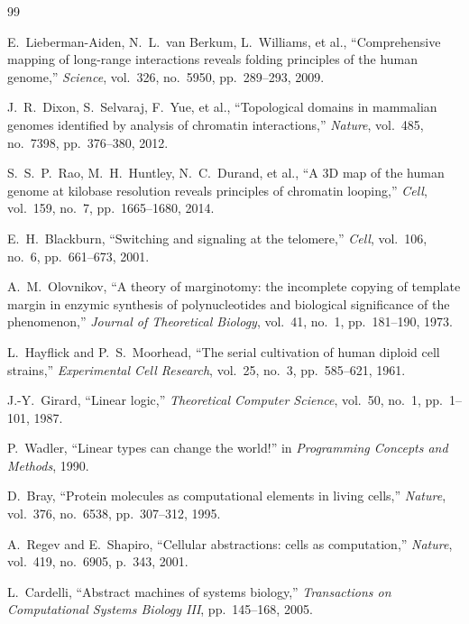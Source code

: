 \documentclass[12pt,a4paper]{article}
\theoremstyle{plain}
\theoremstyle{definition}
\begin{document}
\begin{thebibliography}{99}

E.~Lieberman-Aiden, N.~L.~van Berkum, L.~Williams, et al.,
``Comprehensive mapping of long-range interactions reveals folding principles of the human genome,''
\textit{Science}, vol.~326, no.~5950, pp.~289--293, 2009.

J.~R.~Dixon, S.~Selvaraj, F.~Yue, et al.,
``Topological domains in mammalian genomes identified by analysis of chromatin interactions,''
\textit{Nature}, vol.~485, no.~7398, pp.~376--380, 2012.

S.~S.~P.~Rao, M.~H.~Huntley, N.~C.~Durand, et al.,
``A 3D map of the human genome at kilobase resolution reveals principles of chromatin looping,''
\textit{Cell}, vol.~159, no.~7, pp.~1665--1680, 2014.

E.~H.~Blackburn,
``Switching and signaling at the telomere,''
\textit{Cell}, vol.~106, no.~6, pp.~661--673, 2001.

A.~M.~Olovnikov,
``A theory of marginotomy: the incomplete copying of template margin in enzymic synthesis of polynucleotides and biological significance of the phenomenon,''
\textit{Journal of Theoretical Biology}, vol.~41, no.~1, pp.~181--190, 1973.

L.~Hayflick and P.~S.~Moorhead,
``The serial cultivation of human diploid cell strains,''
\textit{Experimental Cell Research}, vol.~25, no.~3, pp.~585--621, 1961.

J.-Y.~Girard,
``Linear logic,''
\textit{Theoretical Computer Science}, vol.~50, no.~1, pp.~1--101, 1987.

P.~Wadler,
``Linear types can change the world!''
in \textit{Programming Concepts and Methods}, 1990.

D.~Bray,
``Protein molecules as computational elements in living cells,''
\textit{Nature}, vol.~376, no.~6538, pp.~307--312, 1995.

A.~Regev and E.~Shapiro,
``Cellular abstractions: cells as computation,''
\textit{Nature}, vol.~419, no.~6905, p.~343, 2001.

L.~Cardelli,
``Abstract machines of systems biology,''
\textit{Transactions on Computational Systems Biology III}, pp.~145--168, 2005.


\end{thebibliography}
\end{document}

